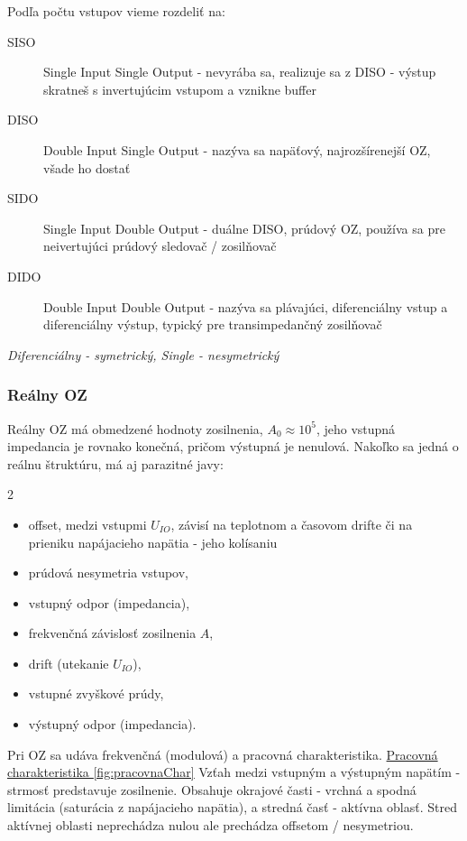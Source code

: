 Podľa počtu vstupov vieme rozdeliť na:
\begin{description}
	\item[SISO] Single Input Single Output - nevyrába sa, realizuje sa z DISO - výstup skratneš s invertujúcim vstupom a vznikne buffer
	\item[DISO] Double Input Single Output - nazýva sa napäťový, najrozšírenejší OZ, všade ho dostať
	\item[SIDO] Single Input Double Output - duálne DISO, prúdový OZ, používa sa pre neivertujúci prúdový sledovač / zosilňovač
	\item[DIDO] Double Input Double Output - nazýva sa plávajúci, diferenciálny vstup a diferenciálny výstup, typický pre transimpedančný zosilňovač
\end{description}
\emph{Diferenciálny - symetrický, Single - nesymetrický}

\subsubsection{Reálny OZ}
Reálny OZ má obmedzené hodnoty zosilnenia, $A_0 \approx 10^5$, jeho vstupná impedancia je rovnako konečná, pričom výstupná je nenulová. Nakoľko sa jedná o reálnu štruktúru, má aj parazitné javy:
\begin{multicols}{2}
	\begin{itemize}
		\item offset, medzi vstupmi $U_{IO}$, závisí na teplotnom a časovom drifte či na prieniku napájacieho napätia - jeho kolísaniu
		\item prúdová nesymetria vstupov,
		\item vstupný odpor (impedancia),
		\item frekvenčná závislosť zosilnenia $A$,
		\item drift (utekanie $U_{IO}$),
		\item vstupné zvyškové prúdy,
		\item výstupný odpor (impedancia).
	\end{itemize}
\end{multicols}

Pri OZ sa udáva frekvenčná (modulová) a pracovná charakteristika. \newline
\underline{Pracovná charakteristika \ref{fig:pracovnaChar}}
Vzťah medzi vstupným a výstupným napätím - strmosť predstavuje zosilnenie. Obsahuje okrajové časti - vrchná a spodná limitácia (saturácia z napájacieho napätia), a stredná časť - aktívna oblasť. Stred aktívnej oblasti neprechádza nulou ale prechádza offsetom / nesymetriou.

